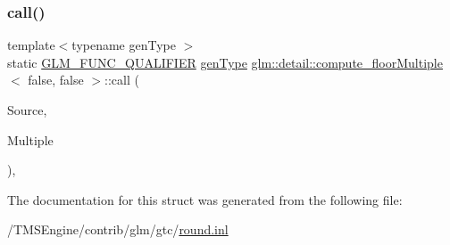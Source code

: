 \subsubsection{\texorpdfstring{call()}{call()}}
{\footnotesize\ttfamily template$<$typename gen\+Type $>$ \\
static \hyperlink{setup_8hpp_a33fdea6f91c5f834105f7415e2a64407}{G\+L\+M\+\_\+\+F\+U\+N\+C\+\_\+\+Q\+U\+A\+L\+I\+F\+I\+ER} \hyperlink{structglm_1_1detail_1_1gen_type}{gen\+Type} \hyperlink{structglm_1_1detail_1_1compute__floor_multiple}{glm\+::detail\+::compute\+\_\+floor\+Multiple}$<$ false, false $>$\+::call (\begin{DoxyParamCaption}\item[{\hyperlink{structglm_1_1detail_1_1gen_type}{gen\+Type}}]{Source,  }\item[{\hyperlink{structglm_1_1detail_1_1gen_type}{gen\+Type}}]{Multiple }\end{DoxyParamCaption})\hspace{0.3cm}{\ttfamily [inline]}, {\ttfamily [static]}}



The documentation for this struct was generated from the following file\+:\begin{DoxyCompactItemize}
\item 
/\+T\+M\+S\+Engine/contrib/glm/gtc/\hyperlink{round_8inl}{round.\+inl}\end{DoxyCompactItemize}
